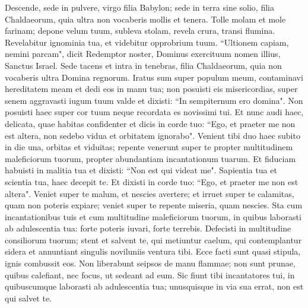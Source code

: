 \begin{biblechapter}  
\verse Descende, sede in pulvere, virgo filia Babylon; sede in terra sine solio, filia Chaldaeorum, quia ultra non vocaberis mollis et tenera. 
\verse Tolle molam et mole farinam; depone velum tuum, subleva stolam, revela crura, transi flumina. 
\verse Revelabitur ignominia tua, et videbitur opprobrium tuum. “Ultionem capiam, nemini parcam", 
\verse dicit Redemptor noster, Dominus exercituum nomen illius, Sanctus Israel. 
\verse Sede tacens et intra in tenebras, filia Chaldaeorum, quia non vocaberis ultra Domina regnorum. 
\verse Iratus sum super populum meum, contaminavi hereditatem meam et dedi eos in manu tua; non posuisti eis misericordias, super senem aggravasti iugum tuum valde 
\verse et dixisti: “In sempiternum ero domina". Non posuisti haec super cor tuum neque recordata es novissimi tui. 
\verse Et nunc audi haec, delicata, quae habitas confidenter et dicis in corde tuo: “Ego, et praeter me non est altera, non sedebo vidua et orbitatem ignorabo". 
\verse Venient tibi duo haec subito in die una, orbitas et viduitas; repente venerunt super te propter multitudinem maleficiorum tuorum, propter abundantiam incantationum tuarum. 
\verse Et fiduciam habuisti in malitia tua et dixisti: “Non est qui videat me". Sapientia tua et scientia tua, haec decepit te. Et dixisti in corde tuo: “Ego, et praeter me non est altera". 
\verse Veniet super te malum, et nescies avertere; et irruet super te calamitas, quam non poteris expiare; veniet super te repente miseria, quam nescies. 
\verse Sta cum incantationibus tuis et cum multitudine maleficiorum tuorum, in quibus laborasti ab adulescentia tua: forte poteris iuvari, forte terrebis. 
\verse Defecisti in multitudine consiliorum tuorum; stent et salvent te, qui metiuntur caelum, qui contemplantur sidera et annuntiant singulis noviluniis ventura tibi. 
\verse Ecce facti sunt quasi stipula, ignis combussit eos. Non liberabunt seipsos de manu flammae; non sunt prunae, quibus calefiant, nec focus, ut sedeant ad eum. 
\verse Sic fiunt tibi incantatores tui, in quibuscumque laborasti ab adulescentia tua; unusquisque in via sua errat, non est qui salvet te. 
\end{biblechapter}

